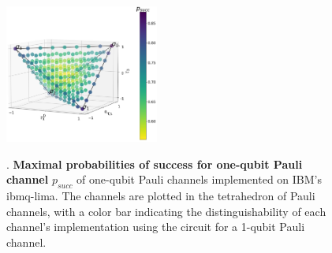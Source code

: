 \documentclass[10pt,letterpaper]{article} %
\begin{document}

\begin{figure}[h!]
\centering
\includegraphics[width=0.45\textwidth]{probabilities-points.png}\\
\caption{. {\bf Maximal probabilities of success for one-qubit Pauli channel} $p_{succ}$ of one-qubit Pauli channels implemented on IBM's ibmq-lima. The channels are plotted in the tetrahedron of Pauli channels, with a color bar indicating the distinguishability of each channel's implementation using the circuit for a 1-qubit Pauli channel.}
\label{fig: fidelity one qubit}
\end{figure}

\newpage
{}
\end{document}
